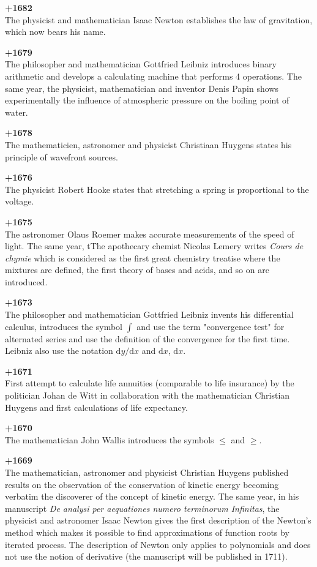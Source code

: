 \textbf{+1682}\\
The physicist and mathematician Isaac Newton establishes the law of gravitation, which now bears his name.

\textbf{+1679}\\
The philosopher and mathematician Gottfried Leibniz introduces binary arithmetic and develops a calculating machine that performs 4 operations. The same year, the physicist, mathematician and inventor Denis Papin shows experimentally the influence of atmospheric pressure on the boiling point of water.

\textbf{+1678}\\
The mathematicien, astronomer and physicist Christiaan Huygens states his principle of wavefront sources.

\textbf{+1676}\\
The physicist Robert Hooke states that stretching a spring is proportional to the voltage.

\textbf{+1675}\\
The astronomer Olaus Roemer makes accurate measurements of the speed of light. The same year, tThe apothecary chemist Nicolas Lemery writes \textit{Cours de chymie} which is considered as the first great chemistry treatise where the mixtures are defined, the first theory of bases and acids, and so on are introduced.

\textbf{+1673}\\
The philosopher and mathematician Gottfried Leibniz invents his differential calculus, introduces the symbol $\int$ and use the term "convergence test" for alternated series and use the definition of the convergence for the first time. Leibniz also use the notation $\mathrm{d}y/\mathrm{d}x$ and $\mathrm{d}x$, $\mathrm{d}x$.

\textbf{+1671}\\
First attempt to calculate life annuities (comparable to life insurance) by the politician Johan de Witt in collaboration with the mathematician Christian Huygens and first calculations of life expectancy.

\textbf{+1670}\\
The mathematician John Wallis introduces the symbols $\le$ and $\ge$.

\textbf{+1669}\\
The mathematician, astronomer and physicist Christian Huygens published results on the observation of the conservation of kinetic energy becoming verbatim the discoverer of the concept of kinetic energy. The same year, in his manuscript \textit{De analysi per aequationes numero terminorum Infinitas}, the physicist and astronomer Isaac Newton gives the first description of the Newton's method which makes it possible to find approximations of function roots by iterated process. The description of Newton only applies to polynomials and does not use the notion of derivative (the manuscript will be published in 1711).

